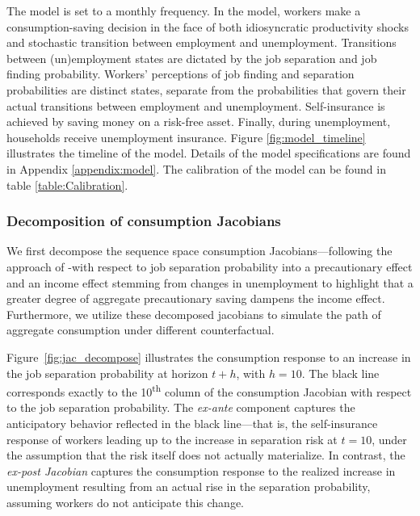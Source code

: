  The model is set to a monthly frequency. In the model, workers make a consumption-saving decision in the face of both idiosyncratic productivity shocks and stochastic transition between employment and unemployment. Transitions between (un)employment states are dictated by the job separation and job finding probability. Workers’ perceptions of job finding and separation probabilities are distinct states, separate from the probabilities that govern their actual transitions between employment and unemployment. Self-insurance is achieved by saving money on a risk-free asset. Finally, during unemployment, households receive unemployment insurance. Figure \ref{fig:model_timeline} illustrates the timeline of the model. Details of the model specifications are found in Appendix \ref{appendix:model}. The calibration of the model can be found in table \ref{table:Calibration}.


\subsubsection*{Decomposition of consumption Jacobians}


 We first decompose the sequence space consumption Jacobians—following the approach of \cite{auclert2021using}-with respect to job separation probability into a precautionary effect and an income effect stemming from changes in unemployment to highlight that a greater degree of aggregate precautionary saving dampens the income effect. Furthermore, we utilize these decomposed jacobians to simulate the path of aggregate consumption under different counterfactual. 
 
Figure~\ref{fig:jac_decompose} illustrates the consumption response to an increase in the job separation probability at horizon \( t + h \), with \( h = 10 \). The black line corresponds exactly to the 10\textsuperscript{th} column of the consumption Jacobian with respect to the job separation probability. The \textit{ex-ante} component captures the anticipatory behavior reflected in the black line---that is, the self-insurance response of workers leading up to the increase in separation risk at \( t = 10 \), under the assumption that the risk itself does not actually materialize. In contrast, the \textit{ex-post Jacobian} captures the consumption response to the realized increase in unemployment resulting from an actual rise in the separation probability, assuming workers do not anticipate this change.



